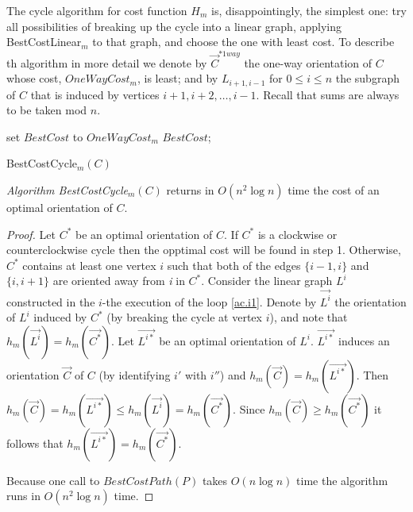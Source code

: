 The cycle algorithm for cost function $H_m$ is, disappointingly, the simplest one: 
try all possibilities of breaking up the cycle into a linear graph, applying 
BestCostLinear$_m$ to that graph, and choose the one with least cost. 
To describe th algorithm in more detail 
we denote by $\vec{C}^{*1way}$ the one-way orientation of $C$
whose cost, ${OneWayCost_m}$, is least; and by $L_{i+1,i-1}$ for $0\leq i \leq n$ 
the subgraph of $C$
that is induced by vertices $i+1,i+2,\ldots, i-1$. Recall that sums are 
always to be taken mod $n$.
\begin{algorithm}
set $BestCost$ to $OneWayCost_m$
\;
	\label{ac.i1} 
	\Return $BestCost$; 
	\caption{BestCostCycle$_m(C)$}
	\label{algo:oc-m}
\end{algorithm}

\bigskip
\begin{theorem}\label{t.cycle-m}
\emph{Algorithm BestCostCycle}$_m(C)$ returns in $O(n^2 \log n)$ time the cost of an optimal 
orientation of $C$.
\end{theorem}
\begin{proof}

Let $C^*$ be an optimal orientation 
of $C$.
If $C^*$ is a clockwise or counterclockwise cycle then the opptimal cost will be found in step 1.
Otherwise, $C^*$ contains at least one vertex $i$ such that both of the edges $\{i-1,i\}$ and $\{i,i+1\}$
are oriented away from \textit{i} in $C^*$.  Consider the linear graph $L^i$ constructed in
the $i$-the execution of the loop \ref{ac.i1}. Denote by $\vec{L^i}$ the orientation of $L^i$ 
induced by $C^*$  (by breaking the cycle at vertex $i$), and note that 
$h_m(\vec{L^i})=h_m(\vec{C^*})$. Let $\vec{L^{i*}}$ be an optimal orientation of $L^i$.
$\vec{L^{i*}}$ induces an orientation $\vec{C}$ of $C$ (by identifying $i'$ with $i''$)
and $h_m(\vec{C})=h_m(\vec{L^{i*}})$.  
Then $h_m(\vec{C})=h_m(\vec{L^{i*}})\leq h_m(\vec{L^i})=h_m(\vec{C^*})$.
Since $h_m(\vec{C})\geq h_m(\vec{C^*})$ it follows that $h_m(\vec{L^{i*}})= h_m(\vec{C^*})$.

Because one call to $BestCostPath(P)$ takes $O(n \log n)$ time the algorithm runs in $O(n^2 \log n)$ time.
\end{proof}